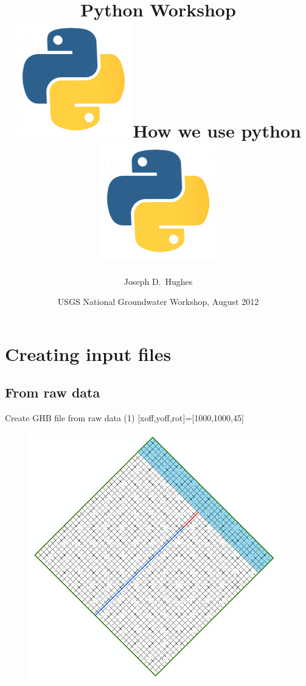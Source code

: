 \documentclass[t]{beamer}
\title[]{Python Workshop\\
 \includegraphics[scale=0.055]{figures/python-app.png}\hspace{5 pt}How we use python\hspace{5 pt}\includegraphics[scale=0.055]{figures/python-app.png} }
\author[Hughes] %
{Joseph D.~Hughes}
\institute[USGS] %
{
  U.S. Geological Survey\\
  Florida Water Science Center, Tampa, Florida USA
  }
\date[UQ12] %
{USGS National Groundwater Workshop, August 2012}
\begin{document}
\begin{frame}
  \titlepage
\end{frame}


\section{Creating input files}
\subsection{From raw data}
\begin{frame}{Create GHB file from raw data (1)}
  \tiny{[xoff,yoff,rot]=[1000,1000,45]}
  \begin{figure}[ht]
  \centering
         \includegraphics[height=0.8\textheight]{figures/CoastalModelBoundary.png}
   \end{figure}
\end{frame}
\end{document}
